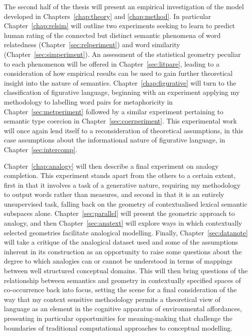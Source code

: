 The second half of the thesis will present an empirical investigation of the model developed in Chapters~\ref{chap:theory} and \ref{chap:method}.  In particular Chapter~\ref{chap:relsim} will outline two experiments seeking to learn to predict human rating of  the connected but distinct semantic phenomena of word relatedness (Chapter~\ref{sec:relperiment}) and word similarity (Chapter~\ref{sec:simperiment}).  An assessment of the statistical geometry peculiar to each phenomenon will be offered in Chapter~\ref{sec:litpare}, leading to a consideration of how empirical results can be used to gain further theoretical insight into the nature of semantics.  Chapter~\ref{chap:figurative} will turn to the classification of figurative language, beginning with an experiment applying my methodology to labelling word pairs for metaphoricity in Chapter~\ref{sec:metperiment} followed by a similar experiment pertaining to semantic type coercion in Chapter~\ref{sec:coerperiment}.  This experimental work will once again lend itself to a reconsideration of theoretical assumptions, in this case assumptions about the informational nature of figurative language, in Chapter~\ref{sec:intercomp}.

Chapter~\ref{chap:analogy} will then describe a final experiment on analogy completion.  This experiment stands apart from the others to a certain extent, first in that it involves a task of a generative nature, requiring my methodology to output words rather than measures, and second in that it is an entirely unsupervised task, falling back on the geometry of contextualised lexical semantic subspaces alone.  Chapter~\ref{sec:parallel} will present the geometric approach to analogy, and then Chapter~\ref{sec:anatext} will explore ways in which contextually selected geometries facilitate analogical modelling.  Finally, Chapter~\ref{sec:datanote} will take a critique of the analogical dataset used and some of the assumptions inherent in its construction as an opportunity to raise some questions about the degree to which analogies can or cannot be understood in terms of mappings between well structured conceptual domains.  This will then bring questions of the relationship between semantics and geometry in contextually specified spaces of co-occurrence back into focus, setting the scene for a final consideration of the way that my context sensitive methodology permits a theoretical view of language as an element in the cognitive apparatus of environmental affordances, presenting in particular opportunities for meaning-making that challenge the boundaries of traditional computational approaches to conceptual modelling.

